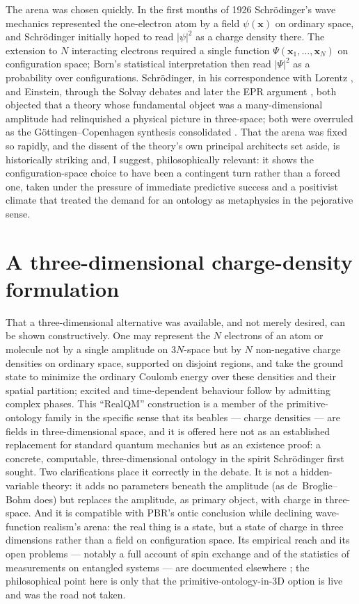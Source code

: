\documentclass[11pt]{article}
\begin{document}
The arena was chosen quickly. In the first months of 1926 Schr\"odinger's wave mechanics represented the
one-electron atom by a field $\psi(\mathbf x)$ on ordinary space, and Schr\"odinger initially hoped to read
$|\psi|^2$ as a charge density there. The extension to $N$ interacting electrons required a single function
$\Psi(\mathbf x_1,\dots,\mathbf x_N)$ on configuration space; Born's statistical interpretation \cite{Born} then
read $|\Psi|^2$ as a probability over configurations. Schr\"odinger, in his correspondence with Lorentz
\cite{Przibram}, and Einstein, through the Solvay debates and later the EPR argument \cite{EPR}, both objected
that a theory whose fundamental object was a many-dimensional amplitude had relinquished a physical picture in
three-space; both were overruled as the G\"ottingen--Copenhagen synthesis consolidated
\cite{MehraRechenberg}. That the arena was fixed so rapidly, and the dissent of the theory's own principal
architects set aside, is historically striking and, I suggest, philosophically relevant: it shows the
configuration-space choice to have been a contingent turn rather than a forced one, taken under the pressure of
immediate predictive success and a positivist climate that treated the demand for an ontology as metaphysics in
the pejorative sense.

\section{A three-dimensional charge-density formulation}\label{sec:realqm}

That a three-dimensional alternative was available, and not merely desired, can be shown constructively. One may
represent the $N$ electrons of an atom or molecule not by a single amplitude on $3N$-space but by $N$
non-negative charge densities on ordinary space, supported on disjoint regions, and take the ground state to
minimize the ordinary Coulomb energy over these densities and their spatial partition; excited and
time-dependent behaviour follow by admitting complex phases. This ``RealQM'' construction \cite{RealQM} is a
member of the primitive-ontology family in the specific sense that its beables --- charge densities --- are
fields in three-dimensional space, and it is offered here not as an established replacement for standard quantum
mechanics but as an existence proof: a concrete, computable, three-dimensional ontology in the spirit
Schr\"odinger first sought. Two clarifications place it correctly in the debate. It is not a hidden-variable
theory: it adds no parameters beneath the amplitude (as de~Broglie--Bohm does) but replaces the amplitude, as
primary object, with charge in three-space. And it is compatible with PBR's ontic conclusion while declining
wave-function realism's arena: the real thing is a state, but a state of charge in three dimensions rather than a
field on configuration space. Its empirical reach and its open problems --- notably a full account of spin
exchange and of the statistics of measurements on entangled systems --- are documented elsewhere \cite{RealQM};
the philosophical point here is only that the primitive-ontology-in-3D option is live and was the road not taken.
\end{document}
